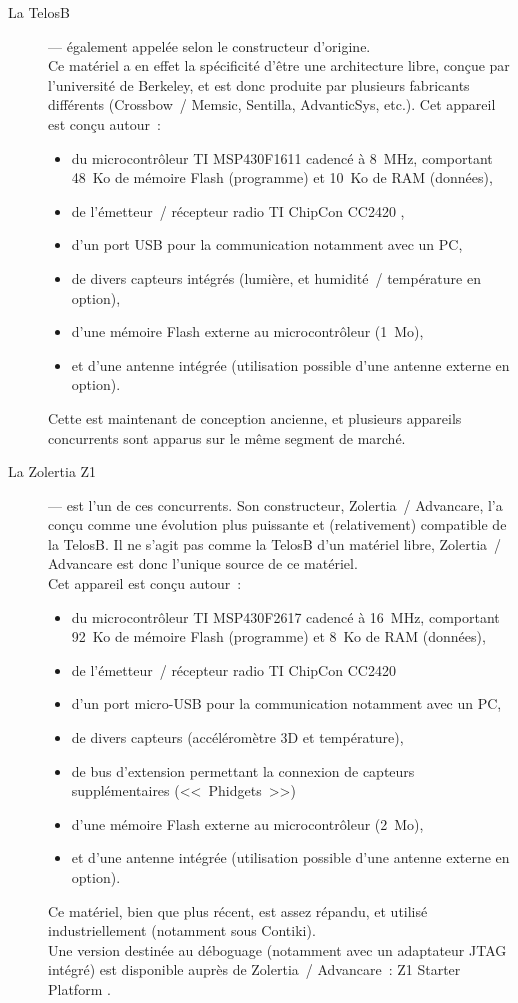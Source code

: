 \begin{description}

\item [La TelosB] \cite{DSTelosB}--- également appelée  selon
le constructeur d'origine.\\
Ce matériel a en effet la spécificité d'être une architecture libre, conçue
par l'université de Berkeley, et est donc produite par plusieurs fabricants
différents (Crossbow~/ Memsic, Sentilla, AdvanticSys, etc.).
\newpage
Cet appareil est conçu autour~:
\begin{itemize}
\item du microcontrôleur TI MSP430F1611 \cite{DSMSP430F1611} cadencé à 8~MHz,
comportant 48~Ko de mémoire Flash (programme) et 10~Ko de RAM (données),
\item de l'émetteur~/ récepteur radio TI ChipCon CC2420 \cite{DSCC2420},
\item d'un port USB pour la communication notamment avec un PC,
\item de divers capteurs intégrés (lumière, et humidité~/ température
en option),
\item d'une mémoire Flash externe au microcontrôleur (1~Mo),
\item et d'une antenne intégrée (utilisation possible d'une antenne externe
en option).
\end{itemize}
Cette  est maintenant de conception ancienne, et plusieurs
appareils concurrents sont apparus sur le même segment de marché.

\item [La Zolertia Z1] \cite{DSZ1}--- est l'un de ces concurrents. Son
constructeur, Zolertia~/ Advancare, l'a conçu comme une évolution plus
puissante et (relativement) compatible de la TelosB. Il ne s'agit pas
comme la TelosB d'un  matériel libre, Zolertia~/ Advancare
est donc l'unique source de ce matériel.\\
Cet appareil est conçu autour~:
\begin{itemize}
\item du microcontrôleur TI MSP430F2617 \cite{DSMSP430F2617} cadencé à 16~MHz,
comportant 92~Ko de mémoire Flash (programme) et 8~Ko de RAM (données),
\item de l'émetteur~/ récepteur radio TI ChipCon CC2420 \cite{DSCC2420}
\item d'un port micro-USB pour la communication notamment avec un PC,
\item de divers capteurs (accéléromètre 3D et température),
\item de bus d'extension permettant la connexion de capteurs
supplémentaires (<<~Phidgets~>>)
\item d'une mémoire Flash externe au microcontrôleur (2~Mo),
\item et d'une antenne intégrée (utilisation possible d'une antenne externe
en option).
\end{itemize}
Ce matériel, bien que plus récent, est assez répandu, et utilisé
industriellement (notamment sous Contiki).\\
Une version destinée au déboguage (notamment avec un adaptateur JTAG
intégré) est disponible auprès de Zolertia~/ Advancare~: Z1 Starter
Platform \cite{DSZ1SP}.


\end{description}
